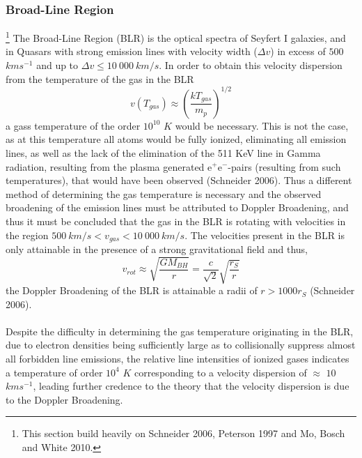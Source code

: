 \documentclass[a4paper, 12pt, twoside]{article}
\begin{document}
\subsubsection{Broad-Line Region}\footnote{This section build heavily on Schneider 2006, Peterson 1997 and Mo, Bosch and White 2010.}
The Broad-Line Region (BLR) is the optical spectra of Seyfert I galaxies, and in Quasars with strong emission lines with velocity width ($\Delta v$) in excess of $500$ $kms^{-1}$ and up to $\Delta v\le 10\ 000\ km/s$. In order to obtain this velocity dispersion from the temperature of the gas in the BLR
\begin{equation}
v(T_{gas}) \approx (\frac{kT_{gas}} {m_{p}})^{1/2}
\label{eq:v_gas_T}
\end{equation}
a gass temperature of the order $10^{10}$ $K$ would be necessary. This is not the case, as at this temperature all atoms would be fully ionized, eliminating all emission lines, as well as the lack of the elimination of the 511 KeV line in Gamma radiation, resulting from the plasma generated e$^{+}$e$^{-}$-pairs (resulting from such temperatures), that would have been observed (Schneider 2006). Thus a different method of determining the gas temperature is necessary and the observed broadening of the emission lines must be attributed to Doppler Broadening, and thus it must be concluded that the gas in the BLR is rotating with velocities in the region $500\ km/s < v_{gas} < 10\ 000\ km/s$. The velocities present in the BLR is only attainable in the presence of a strong gravitational field and thus,
\begin{equation}
v_{rot} \approx \sqrt{\frac{GM_{BH}} {r}} = \frac{c}{\sqrt{2}}\sqrt{\frac{r_{S}}{r}}
\label{eq:v_gas_T}
\end{equation}
the Doppler Broadening of the BLR is attainable a radii of $r > 1000r_{S}$ (Schneider 2006). \\
\\
Despite the difficulty in determining the gas temperature originating in the BLR, due to electron densities being sufficiently large as to collisionally suppress almost all forbidden line emissions, the relative line intensities of ionized gases indicates a temperature of order $10^4$ $K$ corresponding to a velocity dispersion of $\approx$ $10$ $kms^{-1}$, leading further credence to the theory that the velocity dispersion is due to the Doppler Broadening. %
\end{document}
